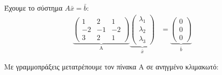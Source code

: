 \documentclass[12pt, fleqn, leqno]{extreport}
\begin{document}
Έχουμε το σύστημα $A\bar{x}=\bar{b}$:
\begin{equation*}
    \begin{aligned}
        \underbrace{
            \begin{pmatrix}
                1  & 2  & 1  \\
                -2 & -1 & -2 \\
                3  & 2  & 1
            \end{pmatrix}}_\text{A}
        \underbrace{
        \begin{pmatrix}
                \lambda_{1} \\
                \lambda_{2} \\
                \lambda_{3}
            \end{pmatrix}}_\text{$\bar{x}$} & =
        \underbrace{
            \begin{pmatrix}
                0 \\
                0 \\
                0
            \end{pmatrix}}_\text{$\bar{b}$}
    \end{aligned}
\end{equation*}

Με γραμμοπράξεις μετατρέπουμε τον πίνακα A σε ανηγμένο κλιμακωτό:
\end{document}
